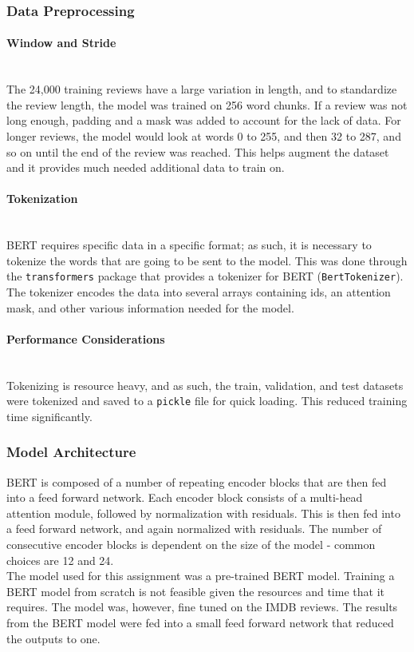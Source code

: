 \documentclass[11pt]{article}
\begin{document}
\subsubsection{Data Preprocessing}
\paragraph{Window and Stride}\mbox{}\\[2mm]
The 24,000 training reviews have a large variation in length, and to standardize the review length, the model was trained on 256 word chunks.  If a review was not long enough, padding and a mask was added to account for the lack of data.  For longer reviews, the model would look at words 0 to 255, and then 32 to 287, and so on until the end of the review was reached.  This helps augment the dataset and it provides much needed additional data to train on.

\paragraph{Tokenization}\mbox{}\\[2mm]
BERT requires specific data in a specific format; as such, it is necessary to tokenize the words that are going to be sent to the model.  This was done through the \texttt{transformers} package that provides a tokenizer for BERT (\texttt{BertTokenizer}).  The tokenizer encodes the data into several arrays containing ids, an attention mask, and other various information needed for the model.

\paragraph{Performance Considerations}\mbox{}\\[2mm]
Tokenizing is resource heavy, and as such, the train, validation, and test datasets were tokenized and saved to a \texttt{pickle} file for quick loading.  This reduced training time significantly.

\subsubsection{Model Architecture}
BERT is composed of a number of repeating encoder blocks that are then fed into a feed forward network.  Each encoder block consists of a multi-head attention module, followed by normalization with residuals.  This is then fed into a feed forward network, and again normalized with residuals.  The number of consecutive encoder blocks is dependent on the size of the model - common choices are 12 and 24.\\[2mm]
The model used for this assignment was a pre-trained BERT model.  Training a BERT model from scratch is not feasible given the resources and time that it requires.  The model was, however, fine tuned on the IMDB reviews.  The results from the BERT model were fed into a small feed forward network that reduced the outputs to one.
\end{document}
